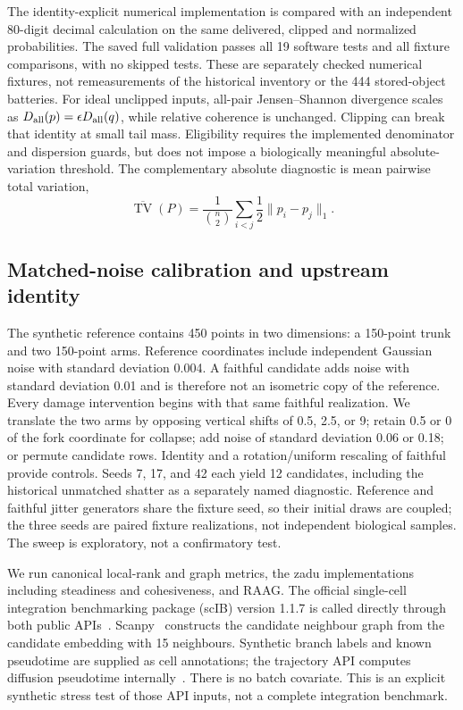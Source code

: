 \documentclass[11pt]{article}
\begin{document}
The identity-explicit numerical implementation is compared with an independent 80-digit decimal calculation on the same delivered, clipped and normalized probabilities. The saved full validation passes all 19 software tests and all fixture comparisons, with no skipped tests. These are separately checked numerical fixtures, not remeasurements of the historical inventory or the 444 stored-object batteries. For ideal unclipped inputs, all-pair Jensen--Shannon divergence scales as $D_{\rm all}(p)=\epsilon D_{\rm all}(q)$, while relative coherence is unchanged. Clipping can break that identity at small tail mass. Eligibility requires the implemented denominator and dispersion guards, but does not impose a biologically meaningful absolute-variation threshold. The complementary absolute diagnostic is mean pairwise total variation,
\begin{equation}
 \overline{\operatorname{TV}}(P)=\frac{1}{\binom n2}\sum_{i<j}\frac12\lVert p_i-p_j\rVert_1.
\end{equation}



\subsection{Matched-noise calibration and upstream identity}

The synthetic reference contains 450 points in two dimensions: a 150-point trunk and two 150-point arms. Reference coordinates include independent Gaussian noise with standard deviation 0.004. A faithful candidate adds noise with standard deviation 0.01 and is therefore not an isometric copy of the reference. Every damage intervention begins with that same faithful realization. We translate the two arms by opposing vertical shifts of 0.5, 2.5, or 9; retain 0.5 or 0 of the fork coordinate for collapse; add noise of standard deviation 0.06 or 0.18; or permute candidate rows. Identity and a rotation/uniform rescaling of faithful provide controls. Seeds 7, 17, and 42 each yield 12 candidates, including the historical unmatched shatter as a separately named diagnostic. Reference and faithful jitter generators share the fixture seed, so their initial draws are coupled; the three seeds are paired fixture realizations, not independent biological samples. The sweep is exploratory, not a confirmatory test.

We run canonical local-rank and graph metrics, the zadu implementations including steadiness and cohesiveness, and RAAG. The official single-cell integration benchmarking package (scIB) version 1.1.7 is called directly through both public APIs~\cite{scib2025software}. Scanpy~\cite{wolf2018scanpy} constructs the candidate neighbour graph from the candidate embedding with 15 neighbours. Synthetic branch labels and known pseudotime are supplied as cell annotations; the trajectory API computes diffusion pseudotime internally~\cite{haghverdi2016diffusion}. There is no batch covariate. This is an explicit synthetic stress test of those API inputs, not a complete integration benchmark.
\end{document}
